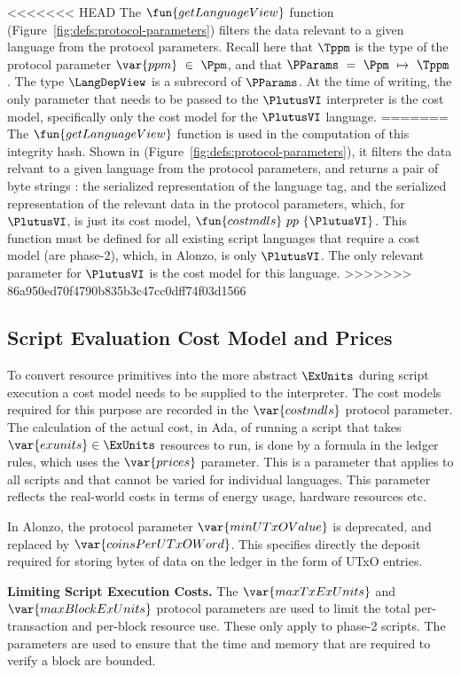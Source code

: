 <<<<<<< HEAD
The $\fun{getLanguageView}$ function (Figure~\ref{fig:defs:protocol-parameters}) filters the data relevant
to a given language from the protocol parameters. Recall here that $\Tppm$ is the type of the
protocol parameter $\var{ppm}~\in~\Ppm$, and that $\PParams~=~\Ppm~\mapsto~\Tppm$.
The type $\LangDepView$ is a subrecord of $\PParams$.
%
At the time of writing, the only parameter that needs to be passed to the $\PlutusVI$
interpreter is the cost model, specifically only the cost model for the $\PlutusVI$ language.
=======
The $\fun{getLanguageView}$ function is used in the computation of this integrity hash.
Shown in (Figure~\ref{fig:defs:protocol-parameters}), it filters the data relvant
to a given language from the protocol parameters, and returns a pair of byte strings :
the serialized representation of
the language tag, and the serialized representation of the relevant data in the protocol
parameters, which, for
$\PlutusVI$, is just its cost model, $\fun{costmdls}~{pp}~\{\PlutusVI\}$.
This function must be defined for all
existing script languages that require a cost model (are phase-2), which, in Alonzo, is only $\PlutusVI$.
The only relevant parameter for $\PlutusVI$ is the cost model for this language.
>>>>>>> 86a950ed70f4790b835b3c47cc0dff74f03d1566

\subsection{Script Evaluation Cost Model and Prices}
\label{sec:cost-mod}

To convert resource primitives into the
more abstract $\ExUnits$ during script execution a cost model needs to be supplied to the interpreter.
The cost models required for this purpose are recorded in the $\var{costmdls}$ protocol parameter.
%
The calculation of the actual cost, in Ada, of running
a script that takes $\var{exunits} \in \ExUnits$ resources to run,
is done by a formula in the ledger rules, which uses the
$\var{prices}$ parameter. This is a parameter that applies to all
scripts and that cannot be varied for individual languages. This parameter
reflects the real-world costs in terms of energy usage, hardware resources etc.

In Alonzo, the protocol parameter $\var{minUTxOValue}$ is deprecated, and replaced by
$\var{coinsPerUTxOWord}$. This specifies directly the deposit required for storing
bytes of data on the ledger in the form of UTxO entries.

\textbf{Limiting Script Execution Costs.}
The $\var{maxTxExUnits}$ and $\var{maxBlockExUnits}$ protocol parameters are
used to limit the total per-transaction and per-block resource use. These only apply to phase-2 scripts.
The parameters are used to ensure that the time and memory that are required to verify a block are bounded.


